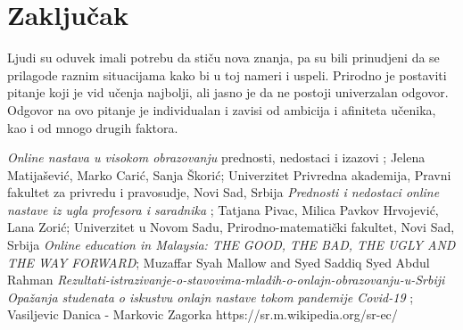 \documentclass{article}
\begin{document}
\newpage

\section{Zaključak}

Ljudi su oduvek imali potrebu da stiču nova znanja, pa su bili prinudjeni da se prilagode raznim situacijama kako bi u toj nameri i uspeli. Prirodno je postaviti pitanje koji je vid učenja najbolji, ali jasno je da ne postoji univerzalan odgovor. 
Odgovor na ovo pitanje je individualan i zavisi od ambicija i afiniteta učenika, kao i od mnogo drugih faktora.


\begin{thebibliography}{9}
     \emph{Online nastava u visokom obrazovanju} prednosti, nedostaci i izazovi ; Jelena Matijašević, Marko Carić, Sanja Škorić; Univerzitet Privredna akademija, Pravni fakultet za privredu i pravosudje, Novi Sad, Srbija
     \emph{Prednosti i nedostaci online nastave iz ugla profesora i saradnika} ; Tatjana Pivac, Milica Pavkov Hrvojević, Lana Zorić; Univerzitet u Novom Sadu, Prirodno-matematički fakultet, Novi Sad, Srbija
     \emph{Online education in Malaysia: THE GOOD, THE BAD, THE UGLY AND THE WAY FORWARD}; Muzaffar Syah Mallow and Syed Saddiq Syed Abdul Rahman
     \emph{Rezultati-istrazivanje-o-stavovima-mladih-o-onlajn-obrazovanju-u-Srbiji}
     \emph{Opažanja studenata o iskustvu onlajn nastave tokom pandemije Covid-19} ; Vasiljevic Danica - Markovic Zagorka
     https://sr.m.wikipedia.org/sr-ec/%
\end{thebibliography}
\end{document}
